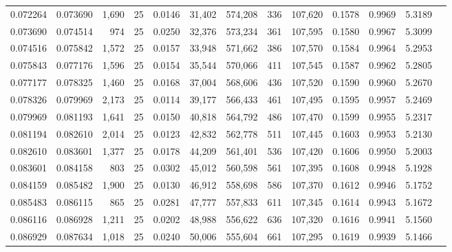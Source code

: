 \begin{tabular}{rrrrrrrrrrrrr}
0.072264 & 0.073690 & 1,690 &  25 &                                     0.0146 &  31,402 & 574,208 &     336 & 107,620 & 0.1578 & 0.9969 & 5.3189 \\
0.073690 & 0.074514 &   974 &  25 &                                     0.0250 &  32,376 & 573,234 &     361 & 107,595 & 0.1580 & 0.9967 & 5.3099 \\
0.074516 & 0.075842 & 1,572 &  25 &                                     0.0157 &  33,948 & 571,662 &     386 & 107,570 & 0.1584 & 0.9964 & 5.2953 \\
0.075843 & 0.077176 & 1,596 &  25 &                                     0.0154 &  35,544 & 570,066 &     411 & 107,545 & 0.1587 & 0.9962 & 5.2805 \\
0.077177 & 0.078325 & 1,460 &  25 &                                     0.0168 &  37,004 & 568,606 &     436 & 107,520 & 0.1590 & 0.9960 & 5.2670 \\
0.078326 & 0.079969 & 2,173 &  25 &                                     0.0114 &  39,177 & 566,433 &     461 & 107,495 & 0.1595 & 0.9957 & 5.2469 \\
0.079969 & 0.081193 & 1,641 &  25 &                                     0.0150 &  40,818 & 564,792 &     486 & 107,470 & 0.1599 & 0.9955 & 5.2317 \\
0.081194 & 0.082610 & 2,014 &  25 &                                     0.0123 &  42,832 & 562,778 &     511 & 107,445 & 0.1603 & 0.9953 & 5.2130 \\
0.082610 & 0.083601 & 1,377 &  25 &                                     0.0178 &  44,209 & 561,401 &     536 & 107,420 & 0.1606 & 0.9950 & 5.2003 \\
0.083601 & 0.084158 &   803 &  25 &                                     0.0302 &  45,012 & 560,598 &     561 & 107,395 & 0.1608 & 0.9948 & 5.1928 \\
0.084159 & 0.085482 & 1,900 &  25 &                                     0.0130 &  46,912 & 558,698 &     586 & 107,370 & 0.1612 & 0.9946 & 5.1752 \\
0.085483 & 0.086115 &   865 &  25 &                                     0.0281 &  47,777 & 557,833 &     611 & 107,345 & 0.1614 & 0.9943 & 5.1672 \\
0.086116 & 0.086928 & 1,211 &  25 &                                     0.0202 &  48,988 & 556,622 &     636 & 107,320 & 0.1616 & 0.9941 & 5.1560 \\
0.086929 & 0.087634 & 1,018 &  25 &                                     0.0240 &  50,006 & 555,604 &     661 & 107,295 & 0.1619 & 0.9939 & 5.1466 \\

\end{tabular}
